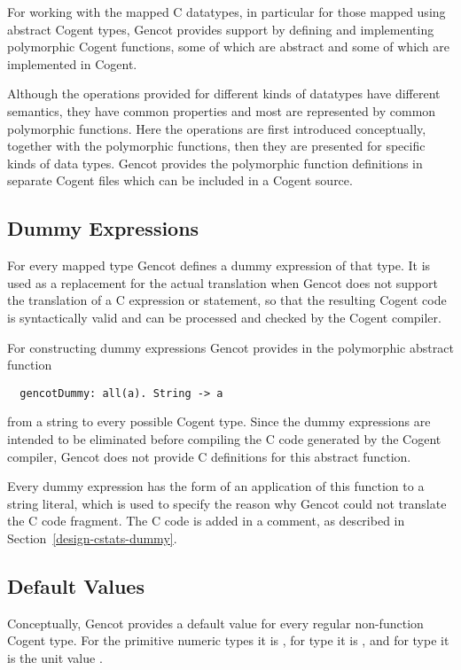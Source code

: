 For working with the mapped C datatypes, in particular for those mapped using abstract Cogent types, Gencot provides support by
defining and implementing polymorphic Cogent functions, some of which are abstract and some of which are implemented in Cogent.

Although the operations provided for different kinds of datatypes have different semantics, they have common properties
and most are represented by common polymorphic functions. Here the operations are first introduced conceptually, together with
the polymorphic functions, then they are presented for specific kinds of data types.
Gencot provides the polymorphic function definitions in separate Cogent files which can be
included in a Cogent source.

\subsection{Dummy Expressions}
\label{design-operations-dummy}

For every mapped type Gencot defines a dummy expression of that type. It is used as a replacement for the actual 
translation when Gencot does not support the translation of a C expression or statement, so that the resulting Cogent code is 
syntactically valid and can be processed and checked by the Cogent compiler.

For constructing dummy expressions Gencot provides in  the polymorphic abstract function
\begin{verbatim}
  gencotDummy: all(a). String -> a
\end{verbatim}
from a string to every possible Cogent type. Since the dummy expressions are intended to be eliminated before compiling the 
C code generated by the Cogent compiler, Gencot does not provide C definitions for this abstract function. 

Every dummy expression has the form of an application of this function to a string literal, which is used to specify
the reason why Gencot could not translate the C code fragment. The C code is added in a comment, as described in 
Section~\ref{design-cstats-dummy}.

\subsection{Default Values}
\label{design-operations-default}

Conceptually, Gencot provides a default value for every regular non-function Cogent type. For the primitive numeric types it is 
, for type  it is , and for type \code{()} it is the unit value \code{()}.

